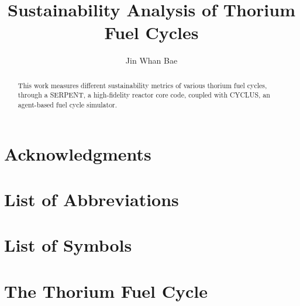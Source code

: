 \documentclass{article}
\begin{document}
\title{Sustainability Analysis of Thorium Fuel Cycles}
\author{Jin Whan Bae}


\begin{abstract}
This work measures different sustainability metrics of various
thorium fuel cycles, through a SERPENT, a high-fidelity reactor core
code, coupled with CYCLUS, an agent-based fuel cycle simulator.
\end{abstract}

\chapter*{Acknowledgments}



\tableofcontents
\listoftables
\listoffigures

\chapter{List of Abbreviations}
\printglossaries
\chapter{List of Symbols}




\chapter{The Thorium Fuel Cycle}
\end{document}
